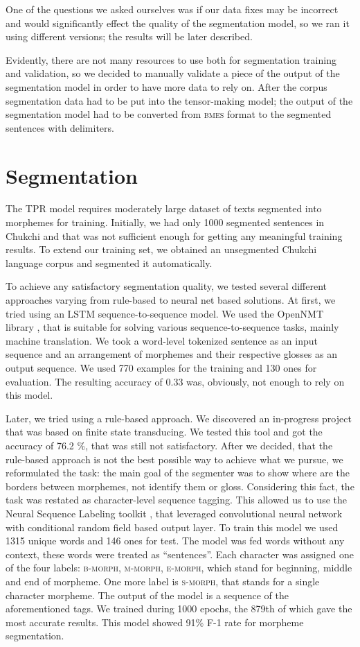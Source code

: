 \documentclass[leqno]{article}
\begin{document}
One of the questions we asked ourselves was if our data fixes may be incorrect and would significantly effect the quality of the segmentation model, so we ran it using different versions; the results will be later described.

Evidently, there are not many resources to use both for segmentation training and validation, so we decided to manually validate a piece of the output of the segmentation model in order to have more data to rely on. 
After the corpus segmentation data had to be put into the tensor-making model; the output of the segmentation model had to be converted from \textsc{bmes} format to the segmented sentences with delimiters.


\section{Segmentation}
The TPR model requires moderately large dataset of texts segmented into morphemes for training. Initially, we had only 1000 segmented sentences in Chukchi and that was not sufficient enough for getting any meaningful training results. To extend our training set, we obtained an unsegmented Chukchi language corpus and segmented it automatically.

To achieve any satisfactory segmentation quality, we tested several different approaches varying from rule-based to neural net based solutions. At first, we tried using an LSTM sequence-to-sequence model. We used the OpenNMT library \parencite{klein-etal-2017-opennmt}, that is suitable for solving various sequence-to-sequence tasks, mainly machine translation. We took a word-level tokenized sentence as an input sequence and an arrangement of morphemes and their respective glosses as an output sequence. We used  770 examples for the training and 130 ones for evaluation. The resulting accuracy of 0.33 was, obviously, not enough to rely on this model.

Later, we tried using a rule-based approach. We discovered an in-progress project \parencite{chkchn} that was based on finite state transducing. We tested this tool and got the accuracy of 76.2 \%, that was still not satisfactory. After we decided, that the rule-based approach is not the best possible way to achieve what we pursue, we reformulated the task: the main goal of the segmenter was to show where are the borders between morphemes, not identify them or gloss. Considering this fact, the task was restated as character-level sequence tagging. This allowed us to use the Neural Sequence Labeling toolkit \parencite{yang2018ncrf}, that leveraged convolutional neural network with conditional random field based output layer. To train this model we used 1315 unique words and 146 ones for test. The model was fed words without any context, these words were treated as “sentences”. Each character was assigned one of the four labels: \textsc{b-morph}, \textsc{m-morph}, \textsc{e-morph}, which stand for beginning, middle and end of morpheme. One more label is \textsc{s-morph}, that stands for a single character morpheme. The output of the model is a sequence of the aforementioned tags. We trained during 1000 epochs, the 879th of which gave the most accurate results. This model showed  91\% F-1 rate for morpheme segmentation.
\end{document}
